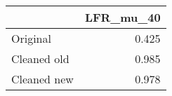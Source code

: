 \begin{tabular}{lr}
\toprule
{} & LFR_mu_40 \\
\midrule
Original    &     0.425 \\
Cleaned old &     0.985 \\
Cleaned new &     0.978 \\
\bottomrule
\end{tabular}
